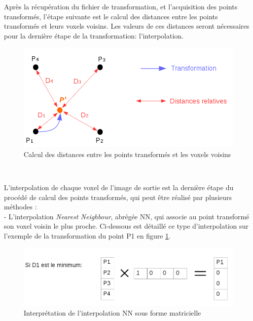\documentclass[10pt]{report}
\begin{document}
	Après la récupération du fichier de transformation, et l'acquisition des points transformés, l'étape suivante est le calcul des distances entre les points transformés et leurs voxels voisins. Les valeurs de ces distances seront nécessaires pour la dernière étape de la transformation: l'interpolation.
	
	\begin{figure}[h!]
		\begin{center}
			\includegraphics[width=12cm]{transform_image.png}	
		\end{center}
		\caption{Calcul des distances entre les points transformés et les voxels voisins}
		\label{Calcul des distances entre les points transformés et les voxels voisins}
	\end{figure}
	~\par 
	L'interpolation de chaque voxel de l'image de sortie est la dernière étape du procédé de calcul des points transformés, qui peut être réalisé par plusieurs méthodes :\\
	- L'interpolation \textit{Nearest Neighbour}, abrégée NN, qui associe au point transformé son voxel voisin le plus proche. Ci-dessous est détaillé ce type d'interpolation sur l'exemple de la transformation du point P1 en figure \ref{Calcul des distances entre les points transformés et les voxels voisins}.\\
	\begin{figure}[h!]
		\begin{center}
			\includegraphics[width=12cm]{calcul_interp_nn.png}	
		\end{center}
		\caption{Interprétation de l'interpolation NN sous forme matricielle}
		\label{Interprétation de l'interpolation NN sous forme matricielle}
	\end{figure}
\end{document}
